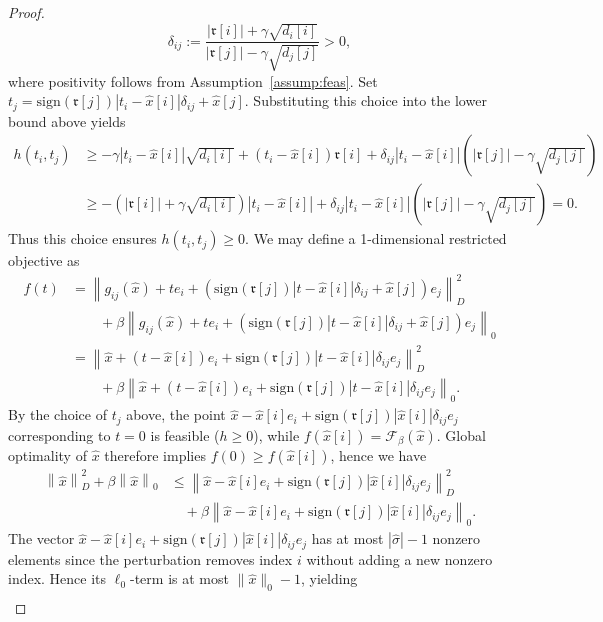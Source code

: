 \documentclass[10pt,a4paper]{amsart}
\newcommand{\abs}[1]{\left\lvert#1\right\rvert}
\newcommand{\cF}{{\mathcal F}}
\newcommand{\ccr}{{\mathfrak r}}
\newcommand{\norm}[1]{\left\lVert#1\right\rVert}
\begin{document}
\begin{proof}
\[     \delta_{ij}:=\frac{\abs{\ccr[i]}+\gamma\sqrt{d_i[i]}}{\abs{\ccr[j]}-\gamma\sqrt{d_j[j]}} >0,
    \]
    where positivity follows from Assumption~\ref{assump:feas}.
     Set $t_j=\mathrm{sign}(\ccr[j])\abs{t_i-\hat{x}[i]}\delta_{ij}+\hat{x}[j]$. Substituting this choice into the lower bound above yields
    \begin{align*}
        h(t_i,t_j)&\geq -\gamma\abs{t_i-\hat{x}[i]}\sqrt{d_i[i]}+(t_i-\hat{x}[i])\ccr[i]+\delta_{ij}\abs{t_i-\hat{x}[i]}(\abs{\ccr[j]}-\gamma\sqrt{d_j[j]})\\
        &\geq -(\abs{\ccr[i]}+\gamma\sqrt{d_i[i]})\abs{t_i-\hat{x}[i]}+\delta_{ij}\abs{t_i-\hat{x}[i]}(\abs{\ccr[j]}-\gamma\sqrt{d_j[j]})=0.
    \end{align*}
    Thus this choice ensures $h(t_i,t_j)\geq 0$. We may define a 1-dimensional restricted objective as
    \begin{align*}
        f(t)&=\norm{g_{ij}(\hat{x})+te_i+(\mathrm{sign}(\ccr[j])\abs{t-\hat{x}[i]}\delta_{ij}+\hat{x}[j])e_j}_D^2\\
        &\qquad +\beta \norm{g_{ij}(\hat{x})+te_i+(\mathrm{sign}(\ccr[j])\abs{t-\hat{x}[i]}\delta_{ij}+\hat{x}[j])e_j}_0\\
        &=\norm{\hat{x}+(t-\hat{x}[i])e_i+\mathrm{sign}(\ccr[j])\abs{t-\hat{x}[i]}\delta_{ij}e_j}_D^2\\
        &\qquad+\beta \norm{\hat{x}+(t-\hat{x}[i])e_i+\mathrm{sign}(\ccr[j])\abs{t-\hat{x}[i]}\delta_{ij}e_j}_0.
    \end{align*}
    By the choice of $t_j$ above, the point $\hat{x}-\hat{x}[i]e_i+\mathrm{sign}(\ccr[j])\abs{\hat{x}[i]}\delta_{ij}e_j$ corresponding to $t=0$ is feasible ($h\geq 0$), while $f(\hat{x}[i])=\cF_\beta(\hat{x})$. Global optimality of $\hat{x}$ therefore implies $f(0)\geq f(\hat{x}[i])$, hence we have
    \begin{align*}
        \norm{\hat{x}}_D^2+\beta\norm{\hat{x}}_0
        &\leq \norm{\hat{x}-\hat{x}[i]e_i+\mathrm{sign}(\ccr[j])\abs{\hat{x}[i]}\delta_{ij}e_j}_D^2\\
&\quad+\beta\norm{\hat{x}-\hat{x}[i]e_i+ \mathrm{sign}(\ccr[j])\abs{\hat{x}[i]}\delta_{ij}e_j}_0.
    \end{align*}
    The vector $\hat{x}-\hat{x}[i]e_i+\mathrm{sign}(\ccr[j])\abs{\hat{x}[i]}\delta_{ij}e_j$ has at most $\abs{\hat{\sigma}}-1$ nonzero elements since the perturbation removes index $i$ without adding a new nonzero index.  Hence its $\ell_0$-term is at most $\|\hat{x}\|_0-1$, yielding
\begin{align}\label{eq:betabound}

\end{align}
\end{proof}
\end{document}
